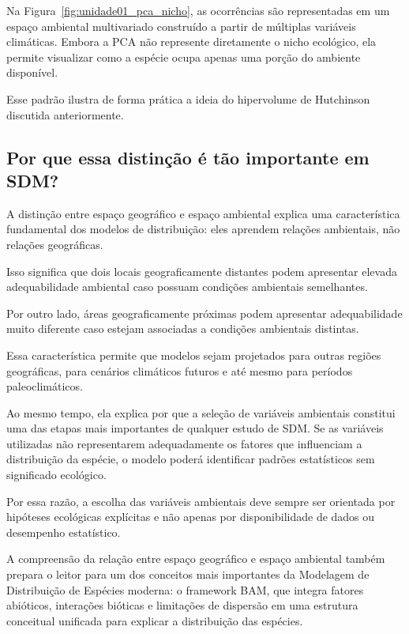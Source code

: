 Na Figura~\ref{fig:unidade01_pca_nicho}, as ocorrências são representadas em um espaço ambiental multivariado construído a partir de múltiplas variáveis climáticas. Embora a PCA não represente diretamente o nicho ecológico, ela permite visualizar como a espécie ocupa apenas uma porção do ambiente disponível.

Esse padrão ilustra de forma prática a ideia do hipervolume de Hutchinson discutida anteriormente.

\subsection{Por que essa distinção é tão importante em SDM?}

A distinção entre espaço geográfico e espaço ambiental explica uma característica fundamental dos modelos de distribuição: eles aprendem relações ambientais, não relações geográficas.

Isso significa que dois locais geograficamente distantes podem apresentar elevada adequabilidade ambiental caso possuam condições ambientais semelhantes.

Por outro lado, áreas geograficamente próximas podem apresentar adequabilidade muito diferente caso estejam associadas a condições ambientais distintas.

Essa característica permite que modelos sejam projetados para outras regiões geográficas, para cenários climáticos futuros e até mesmo para períodos paleoclimáticos.

Ao mesmo tempo, ela explica por que a seleção de variáveis ambientais constitui uma das etapas mais importantes de qualquer estudo de SDM. Se as variáveis utilizadas não representarem adequadamente os fatores que influenciam a distribuição da espécie, o modelo poderá identificar padrões estatísticos sem significado ecológico.

Por essa razão, a escolha das variáveis ambientais deve sempre ser orientada por hipóteses ecológicas explícitas e não apenas por disponibilidade de dados ou desempenho estatístico.

A compreensão da relação entre espaço geográfico e espaço ambiental também prepara o leitor para um dos conceitos mais importantes da Modelagem de Distribuição de Espécies moderna: o framework BAM, que integra fatores abióticos, interações bióticas e limitações de dispersão em uma estrutura conceitual unificada para explicar a distribuição das espécies.

